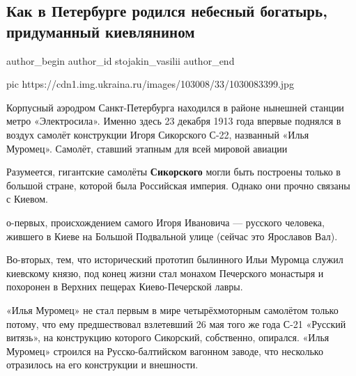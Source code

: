  
 
 
 
 
 
\subsection{Как в Петербурге родился небесный богатырь, придуманный киевлянином}
\label{sec:23_12_2020.news.ru.ukraina_ru.stojakin_vasilii.1.sikorskii_kievljanin}
\ifcmt
	author_begin
   author_id stojakin_vasilii
	author_end
\fi


\ifcmt
pic https://cdn1.img.ukraina.ru/images/103008/33/1030083399.jpg
\fi

Корпусный аэродром Санкт-Петербурга находился в районе нынешней станции метро
«Электросила». Именно здесь 23 декабря 1913 года впервые поднялся в воздух
самолёт конструкции Игоря Сикорского С-22, названный «Илья Муромец». Самолёт,
ставший этапным для всей мировой авиации

Разумеется, гигантские самолёты \textbf{Сикорского} могли быть построены только
в большой стране, которой была Российская империя. Однако они прочно связаны с
Киевом.

о-первых, происхождением самого Игоря Ивановича — русского человека, жившего в
Киеве на Большой Подвальной улице (сейчас это Ярославов Вал).

Во-вторых, тем, что исторический прототип былинного Ильи Муромца служил
киевскому князю, под конец жизни стал монахом Печерского монастыря и похоронен
в Верхних пещерах Киево-Печерской лавры.

«Илья Муромец» не стал первым в мире четырёхмоторным самолётом только потому,
что ему предшествовал взлетевший 26 мая того же года С-21 «Русский витязь», на
конструкцию которого Сикорский, собственно, опирался. «Илья Муромец» строился
на Русско-балтийском вагонном заводе, что несколько отразилось на его
конструкции и внешности.

